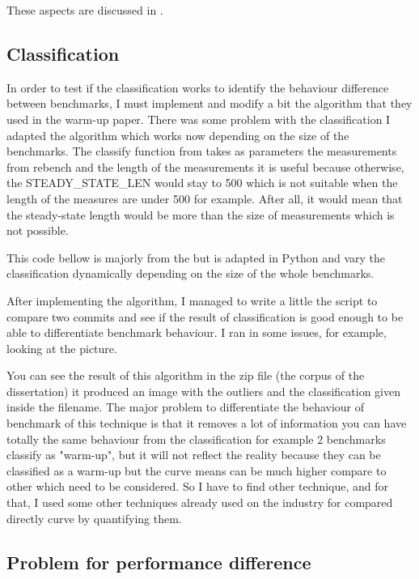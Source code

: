 \documentclass{article}
\begin{document}
These aspects are discussed in \citep{killick2014changepoint}.

\subsection{Classification}

In order to test if the classification works to identify the behaviour difference between benchmarks, I must implement and modify a bit the algorithm that they used in the warm-up paper.
There was some problem with the classification I adapted the algorithm which works now depending on the size of the benchmarks.
The classify function from \citep{barrett2017virtual} takes as parameters the measurements from rebench and the length of the measurements it is useful because otherwise, the STEADY\_STATE\_LEN would stay to 500 which is not suitable when the length of the measures are under 500 for example. After all, it would mean that the steady-state length would be more than the size of measurements which is not possible.

This code bellow is majorly from the \citep{barrett2017virtual} but is adapted in Python and vary the classification dynamically depending on the size of the whole benchmarks.

After implementing the algorithm, I managed to write a little the script to compare two commits and see if the result of classification is good enough to be able to differentiate benchmark behaviour.
I ran in some issues, for example, looking at the picture.


You can see the result of this algorithm in the zip file (the corpus of the dissertation) it produced an image with the outliers and the classification given inside the filename.
The major problem to differentiate the behaviour of benchmark of this technique is that it removes a lot of information you can have totally the same behaviour from the classification for example 2 benchmarks classify as "warm-up", but it will not reflect the reality because they can be classified as a warm-up but the curve means can be much higher compare to other which need to be considered. So I have to find other technique, and for that, I used some other techniques already used on the industry for compared directly curve by quantifying them.



\subsection{Problem for performance difference}
\end{document}
